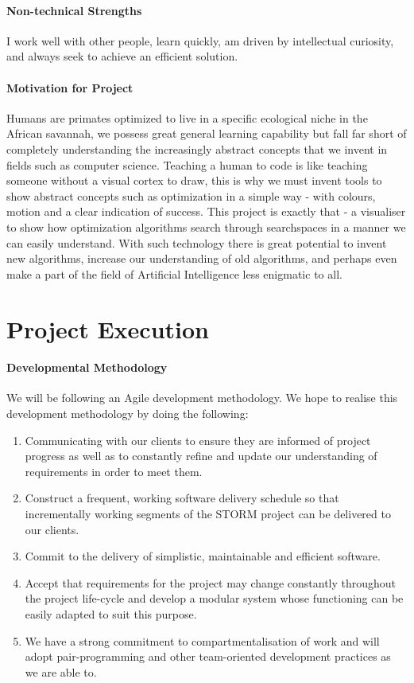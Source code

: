 \documentclass[12pt]{article}
\begin{document}
\paragraph{Non-technical Strengths}
I work well with other people, learn quickly, am driven by intellectual curiosity, and always seek to achieve an efficient solution.
\paragraph{Motivation for Project}
Humans are primates optimized to live in a specific ecological niche in the African savannah, we possess great general learning capability but fall far short of completely understanding the increasingly abstract concepts that we invent in fields such as computer science. Teaching a human to code is like teaching someone without a visual cortex to draw, this is why we must invent tools to show abstract concepts such as optimization in a simple way - with colours, motion and a clear indication of success. This project is exactly that - a visualiser to show how optimization algorithms search through searchspaces in a manner we can easily understand. With such technology there is great potential to invent new algorithms, increase our understanding of old algorithms, and perhaps even make a part of the field of Artificial Intelligence less enigmatic to all.

\section{Project Execution}
\paragraph{Developmental Methodology}
We will be following an Agile development methodology. We hope to realise this development methodology by doing the following:
\begin{enumerate}
\item Communicating with our clients to ensure they are informed of project progress as well as to constantly refine and update our understanding of requirements in order to meet them.
\item Construct a frequent, working software delivery schedule so that incrementally working segments of the STORM project can be delivered to our clients.
\item Commit to the delivery of simplistic, maintainable and efficient software.
\item Accept that requirements for the project may change constantly throughout the project life-cycle and develop a modular system whose functioning can be easily adapted to suit this purpose.
\item We have a strong commitment to compartmentalisation of work and will adopt pair-programming and other team-oriented development practices as we are able to.

\end{enumerate}
\end{document}
